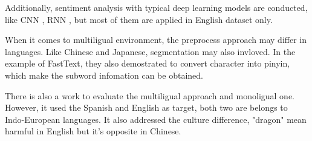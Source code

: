 Additionally, sentiment analysis with typical deep learning models are conducted, like CNN 
\cite{kim2014convolutional}, RNN \cite{arevian2007recurrent}, but most of them are applied in English dataset only. 

When it comes to multiligual environment, the preprocess approach may differ in languages. Like Chinese and Japanese, segmentation may also invloved.
In the example of FastText\cite{joulin2016fasttext}, they also demostrated to convert character into pinyin, which make the subword infomation can be obtained. 

There is also a work\cite{multilingual} to evaluate the multiligual approach and monoligual one. However, it used the Spanish and English as target, both two are belongs 
to Indo-European languages. It also addressed the culture difference, "dragon" mean harmful in English but it's opposite in Chinese. 
